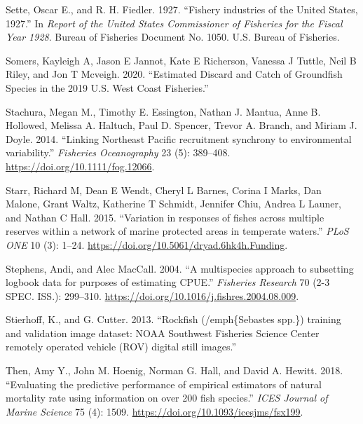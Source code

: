 \documentclass[
  english,
  a4paper,
]{article}
\newlength{\cslhangindent}
\newlength{\cslentryspacingunit} %
\newenvironment{CSLReferences}[2] %
 {%
  \setlength{\parindent}{0pt}
  \ifodd #1
  \let\oldpar\par
  \def\par{\hangindent=\cslhangindent\oldpar}
  \fi
  \setlength{\parskip}{#2\cslentryspacingunit}
 }%
 {}
\begin{document}
\begin{CSLReferences}{1}{0}
\leavevmode{}%
Sette, Oscar E., and R. H. Fiedler. 1927. {``{Fishery industries of the United States, 1927}.''} In \emph{Report of the United States Commissioner of Fisheries for the Fiscal Year 1928}. Bureau of Fisheries Document No. 1050. U.S. Bureau of Fisheries.

\leavevmode{}%
Somers, Kayleigh A, Jason E Jannot, Kate E Richerson, Vanessa J Tuttle, Neil B Riley, and Jon T Mcveigh. 2020. {``{Estimated Discard and Catch of Groundfish Species in the 2019 U.S. West Coast Fisheries}.''}

\leavevmode{}%
Stachura, Megan M., Timothy E. Essington, Nathan J. Mantua, Anne B. Hollowed, Melissa A. Haltuch, Paul D. Spencer, Trevor A. Branch, and Miriam J. Doyle. 2014. {``{Linking Northeast Pacific recruitment synchrony to environmental variability}.''} \emph{Fisheries Oceanography} 23 (5): 389--408. \url{https://doi.org/10.1111/fog.12066}.

\leavevmode{}%
Starr, Richard M, Dean E Wendt, Cheryl L Barnes, Corina I Marks, Dan Malone, Grant Waltz, Katherine T Schmidt, Jennifer Chiu, Andrea L Launer, and Nathan C Hall. 2015. {``{Variation in responses of fishes across multiple reserves within a network of marine protected areas in temperate waters}.''} \emph{PLoS ONE} 10 (3): 1--24. \url{https://doi.org/10.5061/dryad.6hk4h.Funding}.

\leavevmode{}%
Stephens, Andi, and Alec MacCall. 2004. {``{A multispecies approach to subsetting logbook data for purposes of estimating CPUE}.''} \emph{Fisheries Research} 70 (2-3 SPEC. ISS.): 299--310. \url{https://doi.org/10.1016/j.fishres.2004.08.009}.

\leavevmode{}%
Stierhoff, K., and G. Cutter. 2013. {``{Rockfish (/emph{\{}Sebastes spp.{\}}) training and validation image dataset: NOAA Southwest Fisheries Science Center remotely operated vehicle (ROV) digital still images.}''}

\leavevmode{}%
Then, Amy Y., John M. Hoenig, Norman G. Hall, and David A. Hewitt. 2018. {``{Evaluating the predictive performance of empirical estimators of natural mortality rate using information on over 200 fish species}.''} \emph{ICES Journal of Marine Science} 75 (4): 1509. \url{https://doi.org/10.1093/icesjms/fsx199}.


\end{CSLReferences}
\end{document}
